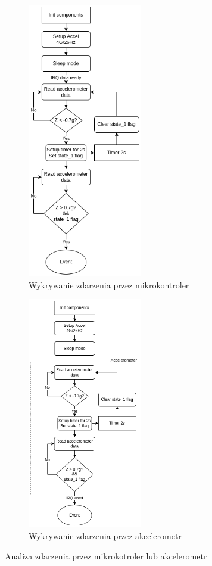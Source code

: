 \begin{figure}[h]
    \centering

    \begin{subfigure}[b]{5cm}
    \includegraphics[width=5cm]{Graphics/Recognize_in_code.png}
    \caption{Wykrywanie zdarzenia przez mikrokontroler}
    \end{subfigure}%
    \hspace{3cm}
    \begin{subfigure}[b]{5cm}
    \includegraphics[width=5cm]{Graphics/Recognize_in_code_acc.png}
    \caption{Wykrywanie zdarzenia przez akcelerometr}
    \end{subfigure}%
    \caption{Analiza zdarzenia przez mikrokotroler lub akcelerometr}
    \label{img:recognize}
\end{figure}
